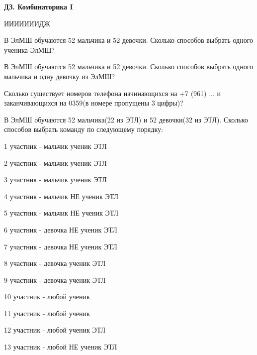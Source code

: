 \centerline{\bf \Huge ДЗ. Комбинаторика I}
\centerline{\bf \Huge }


\begin{flushright}
        \scriptsize{ИИИИИИИДЖ}
\end{flushright}


 В ЭлМШ обучаются 52 мальчика и 52 девочки. Сколько способов выбрать одного ученика ЭлМШ?

 В ЭлМШ обучаются 52 мальчика и 52 девочки. Сколько способов выбрать одного мальчика и одну девочку из ЭлМШ?

 Сколько существует номеров телефона начинающихся на +7 (961) ... и заканчивающихся на 0359(в номере пропущены 3 цифры)?

 В ЭлМШ обучаются 52 мальчика(22 из ЭТЛ) и 52 девочки(32 из ЭТЛ). Сколько способов выбрать команду по следующему порядку:

1 участник - мальчик ученик ЭТЛ

2 участник - мальчик ученик ЭТЛ

3 участник - мальчик ученик ЭТЛ

4 участник - мальчик НЕ ученик ЭТЛ

5 участник - мальчик НЕ ученик ЭТЛ

6 участник - девочка НЕ ученик ЭТЛ

7 участник - девочка НЕ ученик ЭТЛ

8 участник - девочка ученик ЭТЛ

9 участник - девочка ученик ЭТЛ

10 участник - любой ученик

11 участник - любой ученик

12 участник - любой ученик ЭТЛ

13 участник - любой НЕ ученик ЭТЛ